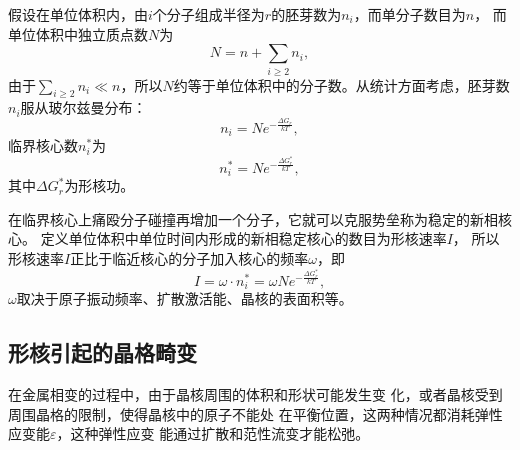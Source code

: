         假设在单位体积内，由$i$个分子组成半径为$r$的胚芽数为$n_i$，而单分子数目为$n$，
        而单位体积中独立质点数$N$为
        \begin{equation}
            N=n+\sum_{i\geq2}n_i,
        \end{equation}
        由于$\sum_{i\geq2}n_i\ll n$，所以$N$约等于单位体积中的分子数。从统计方面考虑，胚芽数$n_i$服从玻尔兹曼分布：
        \begin{equation}
            n_i=N e^{-\frac{\Delta G_r}{kT}},
        \end{equation}
        临界核心数$n_i^*$为
        \begin{equation}
            n_i^*=N e^{-\frac{\Delta G_r^*}{kT}},
        \end{equation}
        其中$\Delta G_r^*$为形核功。

        在临界核心上痛殴分子碰撞再增加一个分子，它就可以克服势垒称为稳定的新相核心。
        定义单位体积中单位时间内形成的新相稳定核心的数目为形核速率$I$，
        所以形核速率$I$正比于临近核心的分子加入核心的频率$\omega$，即
        \begin{equation}
            I=\omega\cdot n_i^*=\omega N e^{-\frac{\Delta G_r^*}{kT}}\label{形核速率},
        \end{equation}
        $\omega$取决于原子振动频率、扩散激活能、晶核的表面积等。

        \subsection{形核引起的晶格畸变}
            在金属相变的过程中，由于晶核周围的体积和形状可能发生变
            化，或者晶核受到周围晶格的限制，使得晶核中的原子不能处
            在平衡位置，这两种情况都消耗弹性应变能$\varepsilon$，这种弹性应变
            能通过扩散和范性流变才能松弛。

